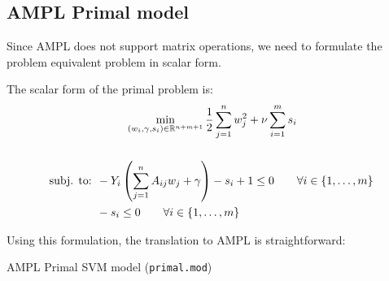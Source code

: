 \pagebreak
\subsection{AMPL Primal model}

Since AMPL does not support matrix operations,
we need to formulate the problem equivalent
problem in scalar form.

The scalar form of the primal problem is:
\begin{align*}
	\span\min_{
		(w_i,\gamma,s_i) \in \mathbb{R}^{n+m+1}
	}
	\frac{1}{2} \sum_{j=1}^n w_j^2 + \nu \sum_{i=1}^m s_i
	\\[1.5em]
	\text{subj. to: } & -Y_i \left( \sum_{j=1}^n A_{ij} w_j + \gamma \right) - s_i + 1 \leq 0 \qquad \forall i \in \{1,\ldots,m\} \\
	                  & -s_i \leq 0 \qquad \forall i \in \{1,\ldots,m\}
\end{align*}


Using this formulation, the translation to AMPL is straightforward:
\begin{listing}[H]
	\caption{AMPL Primal SVM model (\texttt{primal.mod})}
	\inputminted{ampl}{../ampl/primal.mod}
\end{listing}

